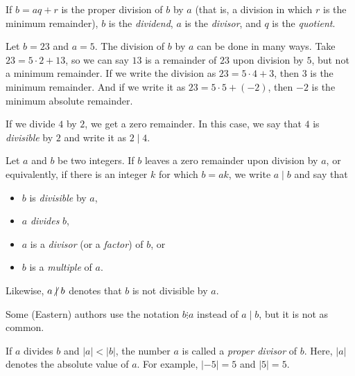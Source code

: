 \documentclass{subfile}
\begin{document}

	\begin{definition}
		If $b=aq+r$ is the proper division of $b$ by $a$ (that is, a division in which $r$ is the minimum remainder), $b$ is the \textit{dividend}, $a$ is the \textit{divisor}, and $q$ is the \textit{quotient}.
	\end{definition}

	\begin{example}
		Let $b=23$ and $a=5$. The division of $b$ by $a$ can be done in many ways. Take $23=5\cdot2+13$, so we can say $13$ is a remainder of $23$ upon division by $5$, but not a minimum remainder. If we write the division as $23=5\cdot4+3$, then $3$ is the minimum remainder. And if we write it as $23=5\cdot5+(-2)$, then $-2$ is the minimum absolute remainder.
	\end{example}

	If we divide $4$ by $2$, we get a zero remainder. In this case, we say that $4$ is \textit{divisible} by $2$ and write it as $2\mid 4$.

	\begin{definition}
		Let $a$ and $b$ be two integers. If $b$ leaves a zero remainder upon division by $a$, or equivalently, if there is an integer $k$ for which $b=ak$, we write $a \mid b$ and say that
		\begin{itemize}
			\item $b$ is \textit{divisible} by $a$,
			\item $a$ \textit{divides} $b$,
			\item $a$ is a \textit{divisor} (or a \textit{factor}) of $b$, or
			\item $b$ is a \textit{multiple} of $a$.
		\end{itemize}
		Likewise, $a\centernot\mid b$ denotes that $b$ is not divisible by $a$.
	\end{definition}

	\begin{remark}
		Some (Eastern) authors use the notation $b\vdots a$ instead of $a\mid b$, but it is not as common.
	\end{remark}

	\begin{definition}
		If $a$ divides $b$ and $|a|<|b|$, the number $a$ is called a \textit{proper divisor} of $b$. Here, $|a|$ denotes the absolute value of $a$. For example, $|-5|=5$ and $|5|=5$.
	\end{definition}
\end{document}
